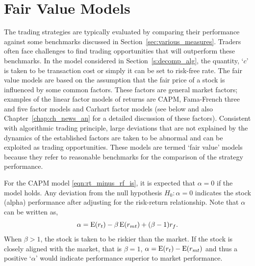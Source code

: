 \section{Fair Value Models} \label{in:fvm1}

The trading strategies are typically evaluated by comparing their performance against some benchmarks discussed in Section~\ref{sec:various_measures}. Traders often face challenges to find trading opportunities that will outperform these benchmarks. In the model considered in Section~\ref{s:decomp_alg}, the quantity, `$c$' is taken to be transaction cost or simply it can be set to risk-free rate. The fair value models are based on the assumption that the fair price of a stock is influenced by some common factors. These factors are general market factors; examples of the linear factor models of returns are CAPM,\label{in:capm1} Fama-French three and five factor models and Carhart factor models (see below and also Chapter~\ref{chap:ch_news_an} for a detailed discussion of these factors). Consistent with algorithmic trading principle, large deviations that are not explained by the dynamics of the established factors are taken to be abnormal and can be exploited as trading opportunities. These models are termed `fair value' models because they refer to reasonable benchmarks for the comparison of the strategy performance.


For the CAPM model \eqref{eqn:rt_minus_rf_is}, it is expected that $\alpha= 0$ if the model holds. Any deviation from the null hypothesis $H_0: \alpha= 0$ indicates the stock (alpha) performance after adjusting for the risk-return relationship. Note that $\alpha$ can be written as,
	\begin{equation} \label{eqn:alpha_written}
	\alpha= \Ex(r_t) - \beta \Ex(r_{mt}) + (\beta -1) r_f.
	\end{equation}
When $\beta>1$, the stock is taken to be riskier than the market. If the stock is closely aligned with the market, that is $\beta=1$, $\alpha= \operatorname{E}(r_t) - \operatorname{E}(r_{mt})$ and thus a positive `$\alpha$' would indicate performance superior to market performance.


